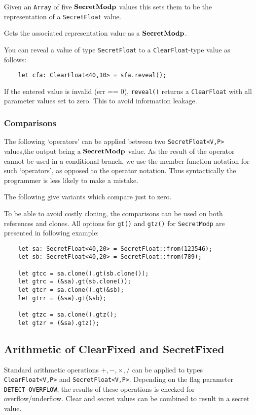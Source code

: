 Given an \verb|Array| of five $\mathbf{SecretModp}$ values this sets them
to be the representation of a \verb|SecretFloat| value.

Gets the associated representation value as a $\mathbf{SecretModp}$.

You can reveal a value of type \verb|SecretFloat| to a \verb|ClearFloat|-type value as follows:
\begin{lstlisting}
    let cfa: ClearFloat<40,10> = sfa.reveal();
\end{lstlisting}
If the entered value is invalid (err == 0), \verb|reveal()| returns a \verb|ClearFloat| with all parameter values set to zero. This to avoid information leakage.

\subsubsection{Comparisons}
The following `operators' can be applied between two \verb|SecretFloat<V,P>|
values,the output being a $\mathbf{SecretModp}$ value.
As the result of the operator cannot be used in a conditional branch,
we use the member function notation for such `operators', as opposed
to the operator notation. Thus syntactically the programmer is less
likely to make a mistake.

\noindent
The following give variants which compare just to zero.

To be able to avoid costly cloning, the comparisons can be used on both 
references and clones. All options for \verb|gt()| and \verb|gtz()| for  
\verb|SecretModp| are presented in following example:
\begin{lstlisting}
    let sa: SecretFloat<40,20> = SecretFloat::from(123546);
    let sb: SecretFloat<40,20> = SecretFloat::from(789);

    let gtcc = sa.clone().gt(sb.clone());
    let gtrc = (&sa).gt(sb.clone());
    let gtcr = sa.clone().gt(&sb);
    let gtrr = (&sa).gt(&sb);

    let gtzc = sa.clone().gtz();
    let gtzr = (&sa).gtz();
\end{lstlisting}

\subsection{Arithmetic of ClearFixed and SecretFixed}
Standard arithmetic operations $+, -, \times, /$ can be applied to
types \verb|ClearFloat<V,P>| and \verb|SecretFloat<V,P>|.
Depending on the flag parameter \verb|DETECT_OVERFLOW|, the results 
of these operations is checked for overflow/underflow.
Clear and secret values can be combined to result in a secret
value.

